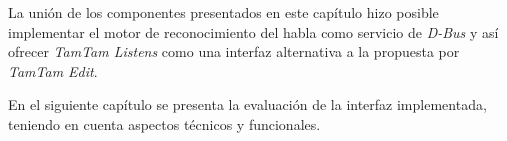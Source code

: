 La uni\'on de los componentes presentados en este cap\'itulo hizo posible implementar el motor 
de reconocimiento del habla como servicio de \emph{D-Bus} y as\'i ofrecer \emph{TamTam Listens} como una interfaz 
alternativa a la propuesta por \emph{TamTam Edit}.

En el siguiente cap\'itulo se presenta la evaluaci\'on de la interfaz implementada, teniendo en cuenta 
aspectos t\'ecnicos y funcionales.

